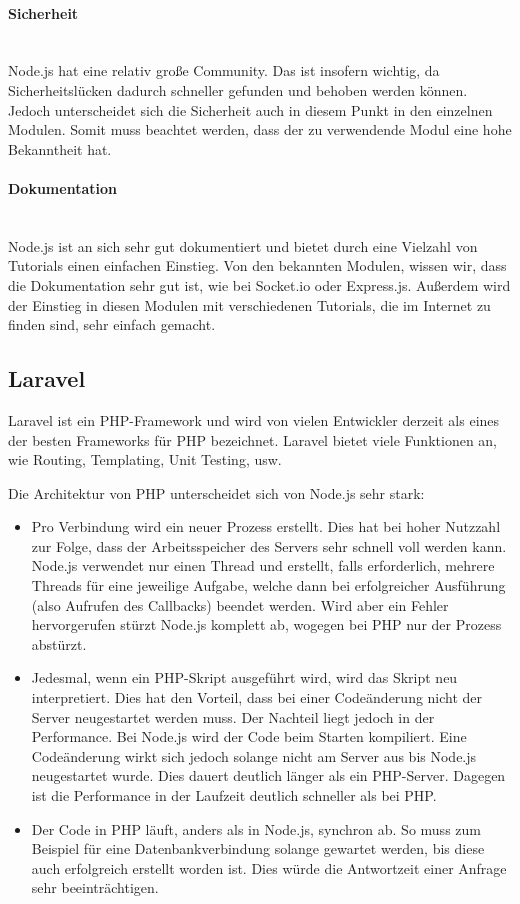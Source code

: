 \documentclass[11pt]{article}
\begin{document}
\paragraph{Sicherheit} \mbox{}\\
Node.js hat eine relativ gro{\ss}e Community. Das ist insofern wichtig, da Sicherheitsl\"ucken dadurch schneller gefunden und behoben werden k\"onnen. Jedoch unterscheidet sich die Sicherheit auch in diesem Punkt in den einzelnen Modulen. Somit muss beachtet werden, dass der zu verwendende Modul eine hohe Bekanntheit hat.

\paragraph{Dokumentation} \mbox{}\\
Node.js ist an sich sehr gut dokumentiert und bietet durch eine Vielzahl von Tutorials einen einfachen Einstieg. Von den bekannten Modulen, wissen wir, dass die Dokumentation sehr gut ist, wie bei Socket.io oder Express.js. Au{\ss}erdem wird der Einstieg in diesen Modulen mit verschiedenen Tutorials, die im Internet zu finden sind, sehr einfach gemacht.

\subsection{Laravel}
Laravel ist ein PHP-Framework und wird von vielen Entwickler derzeit als eines der besten Frameworks für PHP bezeichnet.
Laravel bietet viele Funktionen an, wie Routing, Templating, Unit Testing, usw.

Die Architektur von PHP unterscheidet sich von Node.js sehr stark:
\begin{itemize}
    \item Pro Verbindung wird ein neuer Prozess erstellt. Dies hat bei hoher Nutzzahl zur Folge, dass der Arbeitsspeicher des Servers sehr schnell voll werden kann.
    Node.js verwendet nur einen Thread und erstellt, falls erforderlich, mehrere Threads für eine jeweilige Aufgabe, welche dann bei erfolgreicher Ausführung (also Aufrufen des Callbacks) beendet werden. Wird aber ein Fehler hervorgerufen stürzt Node.js komplett ab, wogegen bei PHP nur der Prozess abstürzt.
    \item Jedesmal, wenn ein PHP-Skript ausgeführt wird, wird das Skript neu interpretiert. Dies hat den Vorteil, dass bei einer Codeänderung nicht der Server neugestartet werden muss. Der Nachteil liegt jedoch in der Performance.
    Bei Node.js wird der Code beim Starten kompiliert. Eine Codeänderung wirkt sich jedoch solange nicht am Server aus bis Node.js neugestartet wurde. Dies dauert deutlich länger als ein PHP-Server. Dagegen ist die Performance in der Laufzeit deutlich schneller als bei PHP.
    \item Der Code in PHP läuft, anders als in Node.js, synchron ab. So muss zum Beispiel für eine Datenbankverbindung solange gewartet werden, bis diese auch erfolgreich erstellt worden ist. Dies würde die Antwortzeit einer Anfrage sehr beeinträchtigen.
\end{itemize}
\end{document}
